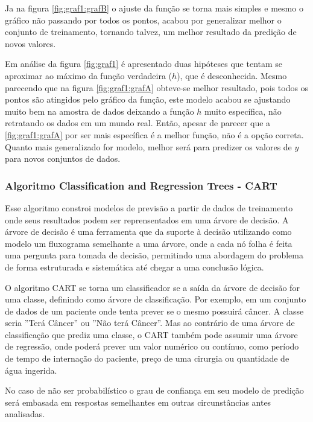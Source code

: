 Ja na figura \ref{fig:graf1:grafB} o ajuste da função se torna mais simples e mesmo o gráfico não passando por todos os pontos, acabou por generalizar melhor o conjunto de treinamento, tornando talvez, um melhor resultado da predição de novos valores. 

Em análise da figura \ref{fig:graf1} é apresentado duas hipóteses que tentam se aproximar ao máximo da função verdadeira (${h}$), que é desconhecida. Mesmo parecendo que  na figura \ref{fig:graf1:grafA} obteve-se melhor resultado, pois todos os pontos são atingidos pelo gráfico da função, este modelo acabou se ajustando muito bem na amostra de dados deixando a função ${h}$ muito específica, não retratando os dados em um mundo real. Então, apesar de parecer que a \ref{fig:graf1:grafA} por ser mais específica é a melhor função, não é a opção correta. Quanto mais  generalizado for modelo, melhor será para predizer os valores de ${y}$ para novos conjuntos de dados.

\subsubsection{Algoritmo Classification and Regression Trees  - CART}\label{cap:refTeor:sssec:cart}


Esse algoritmo constroi modelos de previsão a partir de dados de treinamento onde seus resultados podem ser reprensentados em uma árvore de decisão. A árvore de decisão é uma ferramenta que da suporte à decisão utilizando como modelo um fluxograma semelhante a uma árvore, onde a cada nó folha é feita uma pergunta para tomada de decisão, permitindo uma abordagem do problema de forma estruturada e sistemática até chegar a uma conclusão lógica.

O algoritmo CART se torna um classificador se a saída da árvore de decisão for uma classe, definindo como árvore de classificação. Por exemplo, em um conjunto de dados de um paciente onde tenta prever se o mesmo possuirá câncer. A classe seria ''Terá Câncer'' ou ''Não terá Câncer''. Mas ao contrário de uma árvore de classificação que prediz uma classe, o CART também pode assumir uma árvore de regressão, onde poderá prever um valor numérico ou contínuo, como período de tempo de internação do paciente, preço de uma cirurgia ou quantidade de água ingerida. 

No caso de não ser probabilístico o grau de confiança em seu modelo de predição será embasada em respostas semelhantes em outras circunstâncias antes analisadas. 

